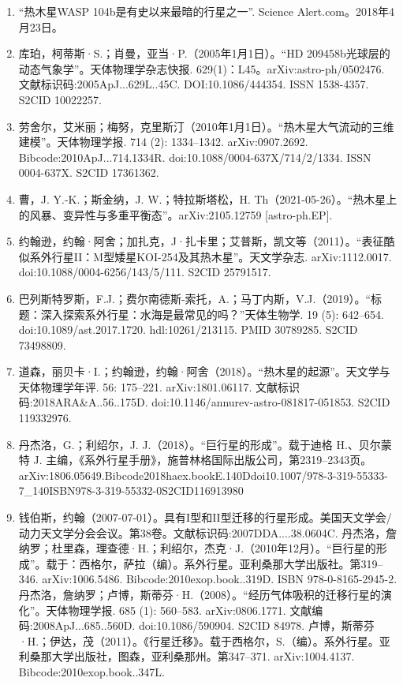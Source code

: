 \begin{enumerate}
\item “热木星WASP 104b是有史以来最暗的行星之一”. Science Alert.com。2018年4月23日。
\item 库珀，柯蒂斯·S.；肖曼，亚当·P.（2005年1月1日）。“HD 209458b光球层的动态气象学”。天体物理学杂志快报. 629(1)：L45。arXiv:astro-ph/0502476. 文献标识码:2005ApJ...629L..45C. DOI:10.1086/444354. ISSN 1538-4357. S2CID 10022257.
\item 劳舍尔，艾米丽；梅努，克里斯汀（2010年1月1日）。“热木星大气流动的三维建模”。天体物理学报. 714 (2): 1334–1342. arXiv:0907.2692. Bibcode:2010ApJ...714.1334R. doi:10.1088/0004-637X/714/2/1334. ISSN 0004-637X. S2CID 17361362.
\item 曹，J. Y.-K.；斯金纳，J. W.；特拉斯塔松，H. Th（2021-05-26）。“热木星上的风暴、变异性与多重平衡态”。arXiv:2105.12759 [astro-ph.EP].
\item 约翰逊，约翰·阿舍；加扎克，J·扎卡里；艾普斯，凯文等（2011）。“表征酷似系外行星II：M型矮星KOI-254及其热木星”。天文学杂志. arXiv:1112.0017. doi:10.1088/0004-6256/143/5/111. S2CID 25791517.
\item 巴列斯特罗斯，F.J.；费尔南德斯-索托，A.；马丁内斯，V.J.（2019）。“标题：深入探索系外行星：水海是最常见的吗？”天体生物学. 19 (5): 642–654. doi:10.1089/ast.2017.1720. hdl:10261/213115. PMID 30789285. S2CID 73498809.
\item 道森，丽贝卡·I.；约翰逊，约翰·阿舍（2018）。“热木星的起源”。天文学与天体物理学年评. 56: 175–221. arXiv:1801.06117. 文献标识码:2018ARA&A..56..175D. doi:10.1146/annurev-astro-081817-051853. S2CID 119332976.
\item 丹杰洛，G.；利绍尔，J. J.（2018）。“巨行星的形成”。载于迪格 H.、贝尔蒙特 J. 主编，《系外行星手册》，施普林格国际出版公司，第2319–2343页。arXiv:1806.05649.Bibcode2018haex.bookE.140Ddoi10.1007/978-3-319-55333-7_140ISBN978-3-319-55332-0S2CID116913980
\item 钱伯斯，约翰（2007-07-01）。具有I型和II型迁移的行星形成。美国天文学会/动力天文学分会会议。第38卷。文献标识码:2007DDA....38.0604C.
 丹杰洛，詹纳罗；杜里森，理查德·H.；利绍尔，杰克·J.（2010年12月）。“巨行星的形成”。载于：西格尔，萨拉（编）。系外行星。亚利桑那大学出版社。第319–346. arXiv:1006.5486. Bibcode:2010exop.book..319D. ISBN 978-0-8165-2945-2.
 丹杰洛，詹纳罗；卢博，斯蒂芬·H.（2008）。“经历气体吸积的迁移行星的演化”。天体物理学报. 685 (1): 560–583. arXiv:0806.1771. 文献编码:2008ApJ...685..560D. doi:10.1086/590904. S2CID 84978.
 卢博，斯蒂芬·H.；伊达，茂（2011）。《行星迁移》。载于西格尔，S.（编）。系外行星。亚利桑那大学出版社，图森，亚利桑那州。第347–371. arXiv:1004.4137. Bibcode:2010exop.book..347L.

\end{enumerate}
